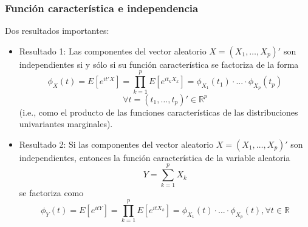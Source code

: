 \documentclass[11pt,a4paper]{article}
\begin{document}
\subsubsection{Función característica e independencia}
Dos resultados importantes:
\begin{itemize}
\item Resultado 1: Las componentes del vector aleatorio $X = (X_{1}, \dots, X_{p})'$ son independientes si y sólo si su función característica se factoriza de la forma
$$\phi_{X}(t) = E[e^{it'X}] = \prod_{k=1}^{p} E[e^{it_{k}X_{k}}] = \phi_{X_{1}}(t_{1}) \cdot ... \cdot \phi_{X_{p}}(t_{p})$$
$$\forall t = (t_{1}, \dots, t_{p})' \in \mathbb{R}^{p}$$
(i.e., como el producto de las funciones características de las distribuciones univariantes marginales).

\item Resultado 2: Si las componentes del vector aleatorio $X = (X_{1}, \dots, X_{p})'$ son independientes, entonces la función característica de la variable aleatoria
$$Y = \sum_{k=1}^{p} X_{k}$$
se factoriza como
$$\phi_{Y}(t) = E[e^{itY}] = \prod_{k=1}^{p} E[e^{itX_{k}}] = \phi_{X_{1}}(t) \cdot ... \cdot \phi_{X_{p}}(t), \forall t \in \mathbb{R}$$
\end{itemize}
\end{document}
